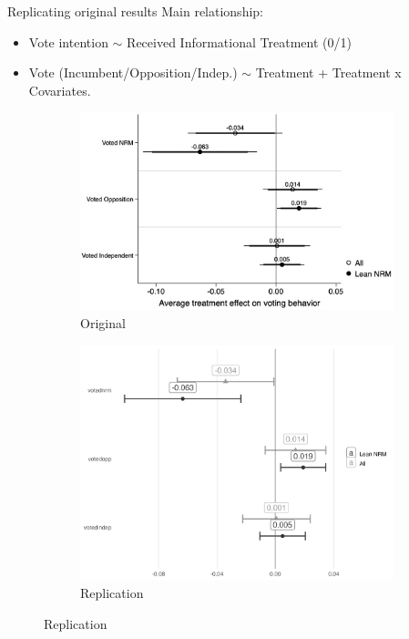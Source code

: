 \documentclass[10pt,table,aspectratio=169]{beamer}
\begin{document}
\begin{frame}[plain, label = two_dimensions]{Replicating original results}
 Main relationship: 
 \begin{itemize}
     \item Vote intention $\sim$ Received Informational Treatment (0/1) 
     \item Vote (Incumbent/Opposition/Indep.) $\sim$  Treatment + Treatment x Covariates. 
 \end{itemize}

        \begin{figure}[H]
    \centering
    \begin{subfigure}{0.48\textwidth}
        \centering
        \includegraphics[width=\linewidth]{figures/experiment_orginal.jpeg}
        \caption{Original}
    \end{subfigure}\hfill
    \begin{subfigure}{0.48\textwidth}
        \centering
        \includegraphics[width=\linewidth]{figures/experiment_repl.png}
        \caption{Replication}
    \end{subfigure}
    \end{figure}
\end{frame}
\end{document}
